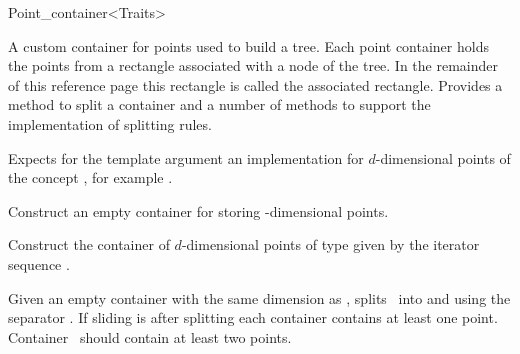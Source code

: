 

\begin{ccRefClass}{Point_container<Traits>}



\begin{ccAdvanced}


\ccDefinition
A custom container for points used to build a tree. Each point container
holds the points from a rectangle associated with a node of the tree.
In the remainder of this reference page this rectangle is called the
associated rectangle.
Provides a method to split a container and a number of methods
to support the implementation of splitting rules.


\ccParameters

Expects for the template argument an implementation for
$d$-dimensional points of the concept , for example
.

\ccTypes


\ccCreation
{}

{
Construct an empty container for storing -dimensional points.
}

{
Construct the container of $d$-dimensional points of type 
given by the iterator sequence \ccc{[begin, end)}.}



\ccOperations

{Given an empty container  with the same dimension as \ccVar, splits \ccVar\ into
\ccVar and  using the separator . If sliding is  after splitting 
each container contains at least one point. Container \ccVar\ should contain at least two points.}



\end{ccAdvanced}
\end{ccRefClass}
